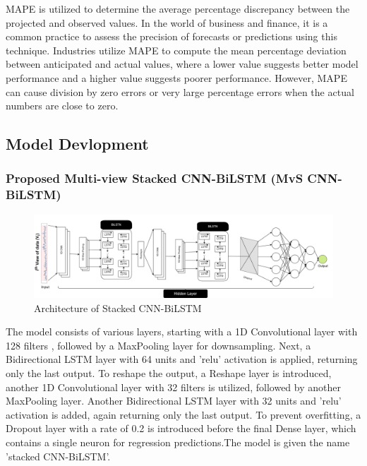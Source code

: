\documentclass[a4paper,fleqn]{cas-dc}
\begin{document}
MAPE is utilized to determine the average percentage discrepancy between the projected and observed values. In the world of business and finance, it is a common practice to assess the precision of forecasts or predictions using this technique. Industries utilize MAPE to compute the mean percentage deviation between anticipated and actual values, where a lower value suggests better model performance and a higher value suggests poorer performance. However, MAPE can cause division by zero errors or very large percentage errors when the actual numbers are close to zero.




\subsection{Model Devlopment}
\subsubsection{Proposed Multi-view Stacked CNN-BiLSTM (MvS CNN-BiLSTM)}
\begin{figure}[h!]
	\centering
		\includegraphics[scale=0.5]{img/Prpose}
	  \caption{Architecture of Stacked CNN-BiLSTM}\label{prosed_cnn-bilstm}
\end{figure}

The model consists of various layers, starting with a 1D Convolutional layer with 128 filters , followed by a MaxPooling layer for downsampling. Next, a Bidirectional LSTM layer with 64 units and 'relu' activation is applied, returning only the last output. To reshape the output, a Reshape layer is introduced, another 1D Convolutional layer with 32 filters is utilized, followed by another MaxPooling layer. Another Bidirectional LSTM layer with 32 units and 'relu' activation is added, again returning only the last output. To prevent overfitting, a Dropout layer with a rate of 0.2 is introduced before the final Dense layer, which contains a single neuron for regression predictions.The model is given the name 'stacked CNN-BiLSTM'.
\end{document}
